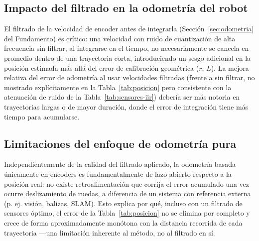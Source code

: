 \subsection{Impacto del filtrado en la odometría del robot}

El filtrado de la velocidad de encoder antes de integrarla (Sección~\ref{sec:odometria} del Fundamento) es crítico: una velocidad con ruido de cuantización de alta frecuencia sin filtrar, al integrarse en el tiempo, no necesariamente se cancela en promedio dentro de una trayectoria corta, introduciendo un sesgo adicional en la posición estimada más allá del error de calibración geométrica ($r$, $L$). La mejora relativa del error de odometría al usar velocidades filtradas (frente a sin filtrar, no mostrado explícitamente en la Tabla~\ref{tab:posicion} pero consistente con la atenuación de ruido de la Tabla~\ref{tab:sensores-iir}) debería ser más notoria en trayectorias largas o de mayor duración, donde el error de integración tiene más tiempo para acumularse.

\subsection{Limitaciones del enfoque de odometría pura}

Independientemente de la calidad del filtrado aplicado, la odometría basada únicamente en encoders es fundamentalmente de lazo abierto respecto a la posición real: no existe retroalimentación que corrija el error acumulado una vez ocurre deslizamiento de ruedas, a diferencia de un sistema con referencia externa (p. ej. visión, balizas, SLAM). Esto explica por qué, incluso con un filtrado de sensores óptimo, el error de la Tabla~\ref{tab:posicion} no se elimina por completo y crece de forma aproximadamente monótona con la distancia recorrida de cada trayectoria —una limitación inherente al método, no al filtrado en sí.

